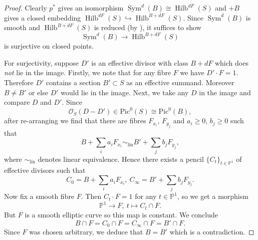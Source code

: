 \documentclass{amsart}
\theoremstyle{definition}
\newcommand{\PP} {\mathbb{P}}
\renewcommand{\O}{\mathcal{O}}
\newcommand{\Pic}{\mathrm{Pic}}
\newcommand{\Sym}{\operatorname{Sym}}
\newcommand{\Hilb}{\operatorname{Hilb}}
\begin{document}
\begin{proof}
Clearly $p^*$ gives an isomorphism $\Sym^d(B) \cong \Hilb^{dF}(S)$ and $+B$ gives a closed embedding $\Hilb^{dF}(S) \hookrightarrow \Hilb^{B+dF}(S)$. Since $\Sym^d(B)$ is smooth and $\Hilb^{B+dF}(S)$ is reduced (by \cite[Lect.~25]{Mum}), it suffices to show  
$$
\Sym^d(B) \rightarrow \Hilb^{B+dF}(S)
$$ 
is surjective on closed points.

For surjectivity, suppose $D'$ is an effective divisor with class $B+dF$ which does \emph{not} lie in the image. Firstly, we note that for any fibre $F$ we have $D' \cdot F = 1$. Therefore $D'$ contains a section $B' \subset S$ as an effective summand. Moreover $B \neq B'$ or else $D'$ would lie in the image. Next, we take any $D$ in the image and compare $D$ and $D'$. Since 
$$
\O_S(D-D') \in \Pic^0(S) \cong \Pic^0(B),
$$ 
after re-arranging we find that there are fibres $F_{x_i}$, $F_{y_j}$ and $a_i \geq 0$, $b_j \geq 0$ such that 
$$
B + \sum_i a_i F_{x_i} \sim_{\mathrm{lin}} B' + \sum_j b_j F_{y_j},
$$
where $\sim_{\mathrm{lin}}$ denotes linear equivalence. Hence there exists a pencil $\{C_t \}_{t \in \PP^1}$ of effective divisors such that
$$
C_0 = B + \sum_i a_i F_{x_i}, \ C_{\infty} = B' + \sum_j b_j F_{y_j}.
$$
Now fix a smooth fibre $F$. Then $C_t \cdot F = 1$ for any $t \in \PP^1$, so we get a morphism
$$
\PP^1 \longrightarrow F, \ t \mapsto C_t \cap F.
$$
But $F$ is a smooth elliptic curve so this map is constant. We conclude
$$
B \cap F = C_0 \cap F = C_{\infty} \cap F = B' \cap F.
$$
Since $F$ was chosen arbitrary, we deduce that $B = B'$ which is a contradiction.
\end{proof}
\end{document}

